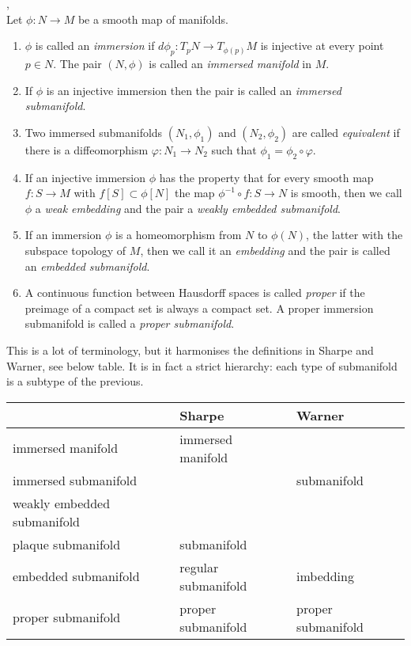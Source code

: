 \begin{definition}\textup{\cite[Def~1.27, Rem~1.33]{Warner1983},\cite[Defs~1.1.36,~1.1.40,~1.2.10,~1.2.21]{Sharpe1997}} \\
Let $\phi : N \to M$ be a smooth map of manifolds.
\begin{enumerate}
\item 
$\phi$ is called an \emph{immersion} if $d\phi_p : T_pN \to T_{\phi(p)}M$ is injective at every point $p \in N$.
The pair $(N,\phi)$ is called an \emph{immersed manifold} in $M$.
\item
If $\phi$ is an injective immersion then the pair is called an \emph{immersed submanifold}.
\item 
Two immersed submanifolds $(N_1,\phi_1)$ and $(N_2,\phi_2)$ are called \emph{equivalent} if there is a diffeomorphism $\varphi : N_1 \to N_2$ such that $\phi_1 = \phi_2 \circ \varphi$.
\item
If an injective immersion $\phi$ has the property that for every smooth map $f: S \to M$ with $f[S] \subset \phi[N]$ the map $\phi^{-1} \circ f : S \to N$ is smooth, then we call $\phi$ a \emph{weak embedding} and the pair a \emph{weakly embedded submanifold}.
\item
If an immersion $\phi$ is a homeomorphism from $N$ to $\phi(N)$, the latter with the subspace topology of $M$, then we call it an \emph{embedding} and the pair is called an \emph{embedded submanifold}.
\item
A continuous function between Hausdorff spaces is called \emph{proper} if the preimage of a compact set is always a compact set.
A proper immersion submanifold is called a \emph{proper submanifold}.
\end{enumerate}
\end{definition}

This is a lot of terminology, but it harmonises the definitions in Sharpe and Warner, see below table.
It is in fact a strict hierarchy: each type of submanifold is a subtype of the previous.

\begin{table}[h]
\begin{tabular}{l|l|l}
 & Sharpe & Warner \\ \hline
immersed manifold & immersed manifold & \\
immersed submanifold & & submanifold \\
weakly embedded submanifold &  &  \\
plaque submanifold & submanifold &  \\
embedded submanifold & regular submanifold & imbedding \\
proper submanifold & proper submanifold & proper submanifold \\
\end{tabular}
\end{table}

